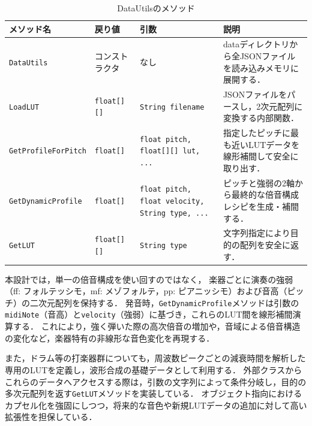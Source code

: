 \documentclass[lualatex,book,paper=a4paper,jafontsize=11.5pt,jafontscale=1.05]{jlreq}
\begin{document}
\begin{table}[H]
    \centering
    \caption{DataUtilsのメソッド}
    \label{table:datautils_methods}
    \begin{tabular}{llp{3.5cm}p{4cm}}
        \hline
        \textbf{メソッド名} & \textbf{戻り値} & \textbf{引数} & \textbf{説明} \\ \hline
        \texttt{DataUtils} & コンストラクタ & なし & dataディレクトリから全JSONファイルを読み込みメモリに展開する． \\ \hline
        \texttt{LoadLUT} & \texttt{float[][]} & \texttt{String filename} & JSONファイルをパースし，2次元配列に変換する内部関数． \\ \hline
        \texttt{GetProfileForPitch} & \texttt{float[]} & \texttt{float pitch, \newline float[][] lut, ...} & 指定したピッチに最も近いLUTデータを線形補間して安全に取り出す． \\ \hline
        \texttt{GetDynamicProfile} & \texttt{float[]} & \texttt{float pitch, \newline float velocity, \newline String type, ...} & ピッチと強弱の2軸から最終的な倍音構成レシピを生成・補間する． \\ \hline
        \texttt{GetLUT} & \texttt{float[][]} & \texttt{String type} & 文字列指定により目的の配列を安全に返す． \\ \hline
    \end{tabular}
\end{table}

本設計では，単一の倍音構成を使い回すのではなく，
楽器ごとに演奏の強弱（ff: フォルテッシモ，mf: メゾフォルテ，pp: ピアニッシモ）および音高（ピッチ）の二次元配列を保持する．
発音時，\texttt{GetDynamicProfile}メソッドは引数の\texttt{midiNote}（音高）と\texttt{velocity}（強弱）に基づき，これらのLUT間を線形補間演算する．
これにより，強く弾いた際の高次倍音の増加や，音域による倍音構造の変化など，楽器特有の非線形な音色変化を再現する．

また，ドラム等の打楽器群についても，周波数ピークごとの減衰時間を解析した専用のLUTを定義し，波形合成の基礎データとして利用する．
外部クラスからこれらのデータへアクセスする際は，引数の文字列によって条件分岐し，目的の多次元配列を返す\texttt{GetLUT}メソッドを実装している．
オブジェクト指向におけるカプセル化を強固にしつつ，将来的な音色や新規LUTデータの追加に対して高い拡張性を担保している．
\end{document}
